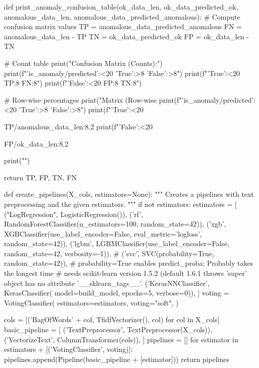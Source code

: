 def print_anomaly_confusion_table(ok_data_len, ok_data_predicted_ok, anomalous_data_len, anomalous_data_predicted_anomalous):
    # Compute confusion matrix values
    TP = anomalous_data_predicted_anomalous
    FN = anomalous_data_len - TP
    TN = ok_data_predicted_ok
    FP = ok_data_len - TN

    # Count table
    print("Confusion Matrix (Counts):")
    print(f"{'is_anomaly/predicted':<20} {'True':>8} {'False':>8}")
    print(f"{'True':<20} {TP:8} {FN:8}")
    print(f"{'False':<20} {FP:8} {TN:8}")

    # Row-wise percentages
    print("\nConfusion Matrix (Row-wise %
    print(f"{'is_anomaly/predicted':<20} {'True':>8} {'False':>8}")
    print(f"{'True':<20} {TP/anomalous_data_len:8.2%
    print(f"{'False':<20} {FP/ok_data_len:8.2%

    print("\n\n")

    return TP, FP, TN, FN


def create_pipelines(X_cols, estimators=None):
    """
    Creates a pipelines with text preprocessing and the given estimators.
    """
    if not estimators:
        estimators = [
            ("LogRegression", LogisticRegression()),
            ('rf', RandomForestClassifier(n_estimators=100, random_state=42)),
            ('xgb', XGBClassifier(use_label_encoder=False,
             eval_metric='logloss', random_state=42)),
            ('lgbm', LGBMClassifier(use_label_encoder=False,
             random_state=42, verbosity=-1)),
            # ('svc', SVC(probability=True, random_state=42)),  # probability=True enables predict_proba; Probably takes the longest time
            # needs scikit-learn version 1.5.2 (default 1.6.1 throws 'super' object has no attribute '__sklearn_tags__'.
            ('KerasNNClassifier', KerasClassifier(
                model=build_model, epochs=5, verbose=0)),
        ]
    voting = VotingClassifier(
        estimators=estimators,
        voting="soft",
    )

    cols = [('BagOfWords' + col, TfidfVectorizer(), col) for col in X_cols]
    basic_pipeline = [
        ('TextPreprocessor', TextPreprocessor(X_cols)),
        ('VectorizeText', ColumnTransformer(cols)),
    ]
    pipelines = []
    for estimator in estimators + [('VotingClassifier', voting)]:
        pipelines.append(Pipeline(basic_pipeline + [estimator]))
    return pipelines


}}
